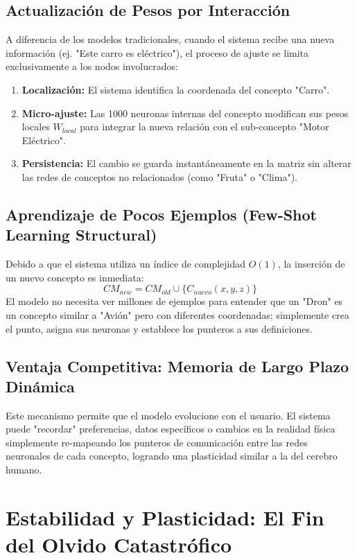 \documentclass[12pt]{article}
\begin{document}
\subsection{Actualización de Pesos por Interacción}
A diferencia de los modelos tradicionales, cuando el sistema recibe una nueva información (ej. "Este carro es eléctrico"), el proceso de ajuste se limita exclusivamente a los nodos involucrados:
\begin{enumerate}
    \item \textbf{Localización:} El sistema identifica la coordenada del concepto "Carro".
    \item \textbf{Micro-ajuste:} Las 1000 neuronas internas del concepto modifican sus pesos locales $W_{local}$ para integrar la nueva relación con el sub-concepto "Motor Eléctrico".
    \item \textbf{Persistencia:} El cambio se guarda instantáneamente en la matriz sin alterar las redes de conceptos no relacionados (como "Fruta" o "Clima").
\end{enumerate}

\subsection{Aprendizaje de Pocos Ejemplos (Few-Shot Learning Structural)}
Debido a que el sistema utiliza un índice de complejidad $O(1)$, la inserción de un nuevo concepto es inmediata:
$$ CM_{new} = CM_{old} \cup \{C_{nuevo}(x,y,z)\} $$
El modelo no necesita ver millones de ejemplos para entender que un "Dron" es un concepto similar a "Avión" pero con diferentes coordenadas; simplemente crea el punto, asigna sus neuronas y establece los punteros a sus definiciones.

\subsection{Ventaja Competitiva: Memoria de Largo Plazo Dinámica}
Este mecanismo permite que el modelo evolucione con el usuario. El sistema puede "recordar" preferencias, datos específicos o cambios en la realidad física simplemente re-mapeando los punteros de comunicación entre las redes neuronales de cada concepto, logrando una plasticidad similar a la del cerebro humano.


\section{Estabilidad y Plasticidad: El Fin del Olvido Catastrófico}
\end{document}
